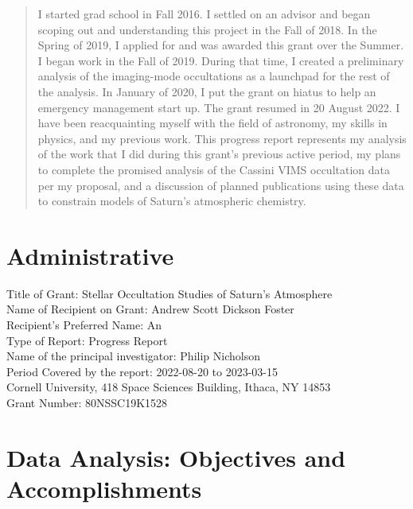 \documentclass[12pt]{article}
\begin{document}
\maketitle

\begin{abstract}

I started grad school in Fall 2016.  I settled on an advisor and began scoping
out and understanding this project in the Fall of 2018.  In the Spring of 2019,
I applied for and was awarded this grant over the Summer. I began work in the
Fall of 2019.  During that time, I created a preliminary analysis of the
imaging-mode occultations as a launchpad for the rest of the analysis.  In
January of 2020, I put the grant on hiatus to help an emergency management
start up.  The grant resumed in 20 August 2022. I have been reacquainting myself
with the field of astronomy, my skills in physics, and my previous work.  This
progress report represents my analysis of the work that I did during this
grant's previous active period, my plans to complete the promised analysis of
the Cassini VIMS occultation data per my proposal, and a discussion of planned
publications using these data to constrain models of Saturn's atmospheric
chemistry.

\end{abstract}

\section{Administrative}

Title of Grant: Stellar Occultation Studies of Saturn’s Atmosphere\\
Name of Recipient on Grant: Andrew Scott Dickson Foster\\
Recipient's Preferred Name: An\\
Type of Report: Progress Report\\
Name of the principal investigator: Philip Nicholson\\
Period Covered by the report: 2022-08-20 to 2023-03-15 \\
Cornell University, 418 Space Sciences Building, Ithaca, NY 14853\\
Grant Number: 80NSSC19K1528\\

\section{Data Analysis: Objectives and Accomplishments}
\end{document}

